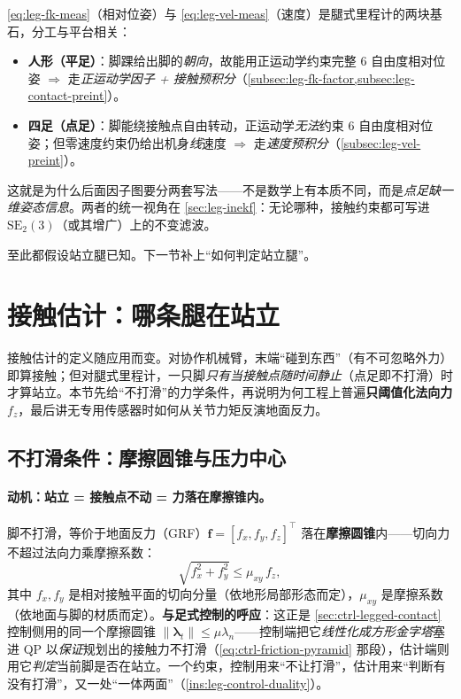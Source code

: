 \begin{insight}\label{ins:leg-two-measurements}
\cref{eq:leg-fk-meas}（相对位姿）与 \cref{eq:leg-vel-meas}（速度）是腿式里程计的两块基石，分工与平台相关：
\begin{itemize}
  \item \textbf{人形（平足）}：脚踝给出脚的\emph{朝向}，故能用正运动学约束完整 $6$ 自由度相对位姿 $\Rightarrow$ 走\emph{正运动学因子 + 接触预积分}（\cref{subsec:leg-fk-factor,subsec:leg-contact-preint}）。
  \item \textbf{四足（点足）}：脚能绕接触点自由转动，正运动学\emph{无法}约束 $6$ 自由度相对位姿；但零速度约束仍给出机身\emph{线}速度 $\Rightarrow$ 走\emph{速度预积分}（\cref{subsec:leg-vel-preint}）。
\end{itemize}
这就是为什么后面因子图要分两套写法——不是数学上有本质不同，而是\emph{点足缺一维姿态信息}。两者的统一视角在 \cref{sec:leg-inekf}：无论哪种，接触约束都可写进 $\mathrm{SE}_2(3)$（或其增广）上的不变滤波。
\end{insight}

至此都假设站立腿已知。下一节补上“如何判定站立腿”。

\section{接触估计：哪条腿在站立}
\label{sec:leg-contact}

接触估计的定义随应用而变。对协作机械臂，末端“碰到东西”（有不可忽略外力）即算接触；但对腿式里程计，一只脚\emph{只有当接触点随时间静止}（点足即不打滑）时才算站立。本节先给“不打滑”的力学条件，再说明为何工程上普遍\textbf{只阈值化法向力 $f_z$}，最后讲无专用传感器时如何从关节力矩反演地面反力。

\subsection{不打滑条件：摩擦圆锥与压力中心}
\label{subsec:leg-friction}

\paragraph{动机：站立 = 接触点不动 = 力落在摩擦锥内。}
脚不打滑，等价于地面反力（GRF）$\mathbf{f}=[f_x,f_y,f_z]^\top$ 落在\textbf{摩擦圆锥}内——切向力不超过法向力乘摩擦系数：
\begin{equation}
  \sqrt{f_x^2+f_y^2}\le\mu_{xy}\,f_z,
  \label{eq:leg-friction-cone}
\end{equation}
其中 $f_x,f_y$ 是相对接触平面的切向分量（依地形局部形态而定），$\mu_{xy}$ 是摩擦系数（依地面与脚的材质而定）。\textbf{与足式控制的呼应}：这正是 \cref{sec:ctrl-legged-contact} 控制侧用的同一个摩擦圆锥 $\|\boldsymbol{\lambda}_t\|\le\mu\lambda_n$——控制端把它\emph{线性化成方形金字塔}塞进 QP 以\emph{保证}规划出的接触力不打滑（\cref{eq:ctrl-friction-pyramid} 那段），估计端则用它\emph{判定}当前脚是否在站立。一个约束，控制用来“不让打滑”，估计用来“判断有没有打滑”，又一处“一体两面”（\cref{ins:leg-control-duality}）。

